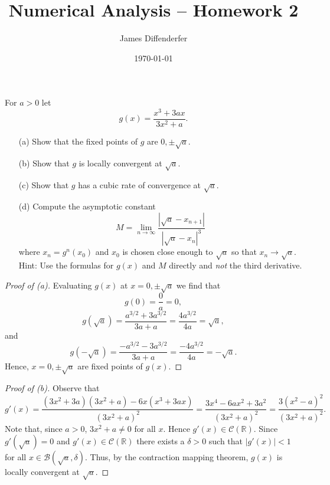 \documentclass[8pt]{article}
\title{Numerical Analysis -- Homework 2}
\author{James Diffenderfer}
\date{\today}
\theoremstyle{definition}
\newenvironment{exercise}[1]
  {\renewcommand\theinnerexercise{#1}\innerexercise}
  {\endinnerexercise}
\begin{document}
\maketitle


\begin{exercise}{1}
For $a > 0$ let $$g(x) = \frac{x^3 + 3 ax}{3x^2 + a}.$$
\begin{enumerate}
	\item[(a)] Show that the fixed points of $g$ are $0, \pm \sqrt{a}$.
	\item[(b)] Show that $g$ is locally convergent at $\sqrt{a}$.
	\item[(c)] Show that $g$ has a cubic rate of convergence at $\sqrt{a}$.
	\item [(d)] Compute the asymptotic constant $$M = \lim_{n \to \infty} \frac{| \sqrt{a} - x_{n + 1}|}{| \sqrt{a} - x_n |^3}$$ where $x_n = g^{n} (x_0)$ and $x_0$ is chosen close enough to $\sqrt{a}$ so that $x_n \to \sqrt{a}$. Hint: Use the formulas for $g(x)$ and $M$ directly and \emph{not} the third derivative.
\end{enumerate}
\end{exercise}
\begin{proof}[Proof of (a)]
Evaluating $g(x)$ at $x = 0, \pm \sqrt{a}$ we find that $$g(0) = \frac{0}{a} = 0,$$ $$g \left( \sqrt{a} \right) = \frac{a^{3/2} + 3 a^{3/2}}{3a + a} = \frac{4 a^{3/2}}{4a} = \sqrt{a},$$ and $$g \left( -\sqrt{a} \right) = \frac{-a^{3/2} - 3 a^{3/2}}{3a + a} =  \frac{-4 a^{3/2}}{4a} = -\sqrt{a}.$$ Hence, $x = 0, \pm \sqrt{a}$ are fixed points of $g(x)$.
\end{proof}

\begin{proof}[Proof of (b)]
Observe that $$g'(x) = \frac{(3x^2 + 3a) (3x^2 + a) - 6x (x^3 + 3ax)}{(3x^2 + a)^2} = \frac{3 x^4 - 6ax^2 + 3a^2}{(3x^2 + a)^2} = \frac{3 (x^2 - a)^2}{(3x^2 + a)^2}.$$ Note that, since $a > 0$, $3x^2 + a \neq 0$ for all $x$. Hence $g'(x) \in \mathcal{C} (\mathbb{R})$. Since $g'(\sqrt{a}) = 0$ and $g'(x) \in \mathcal{C} (\mathbb{R})$ there exists a $\delta > 0$ such that $|g'(x)| < 1$ for all $x \in \mathcal{B} (\sqrt{a}, \delta)$. Thus, by the contraction mapping theorem, $g(x)$ is locally convergent at $\sqrt{a}$. 
\end{proof}
\end{document}
